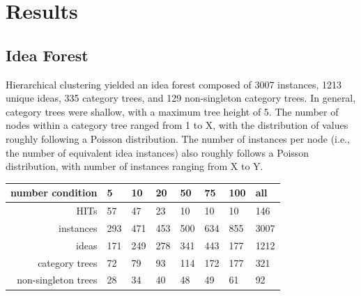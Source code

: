 \section{Results}

\subsection{Idea Forest}

Hierarchical clustering yielded an idea forest composed of 3007 instances, 1213 unique ideas, 335 category trees, and 129 non-singleton category trees. In general, category trees were shallow, with a maximum tree height of 5. The number of nodes within a category tree ranged from 1 to X, with the distribution of values roughly following a Poisson distribution. The number of instances per node (i.e., the number of equivalent idea instances) also roughly follows a Poisson distribution, with number of instances ranging from X to Y.

\begin{table}
	\begin{tabular}[h!]{r | l l l l l l l}
	\textbf{number condition} & 5 & 10 & 20 & 50 & 75 & 100 & all \\ \hline \hline
	HITs & 57 & 47 & 23 & 10 & 10 & 10 & 146\\
	instances & 293 & 471 & 453 & 500 & 634 & 855 & 3007\\
	ideas & 171 & 249 & 278 & 341 & 443 & 177 &1212\\
	category trees & 72 & 79 & 93 & 114 & 172 & 177 &321\\
	non-singleton trees & 28 & 34 & 40 & 48 & 49 & 61 &92\\
	\end{tabular}
\end{table}



